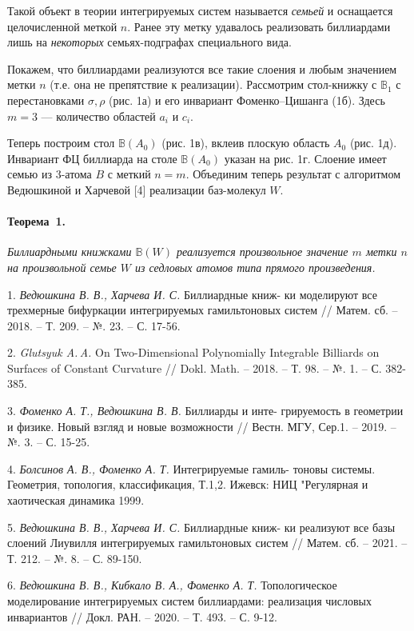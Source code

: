 Такой объект в теории интегрируемых систем называется \textit{семьей} и оснащается целочисленной меткой $n$. Ранее эту метку удавалось реализовать биллиардами лишь на \textit{некоторых} семьях-подграфах специального вида. %
 
Покажем, что биллиардами реализуются все такие слоения и любым значением метки $n$ (т.е. она не препятствие к реализации). Рассмотрим стол-книжку с  $\mathbb{B}_1$ с перестановками $\sigma, \rho$ (рис. 1а) и его инвариант Фоменко--Цишанга (1б). Здесь $m = 3$ --- количество областей $a_i$ и $c_i$. 

Теперь построим стол $\mathbb{B}(A_0)$ (рис. 1в), вклеив плоскую область $A_0$ (рис. 1д). Инвариант ФЦ биллиарда на столе $\mathbb{B}(A_0)$ указан на рис. 1г. Слоение имеет семью из 3-атома $B$ с меткий $n = m$. Объединим теперь результат с алгоритмом Ведюшкиной и Харчевой [4]  реализации баз-молекул $W$.

\paragraph{Теорема~1.}
{\it
	Биллиардными книжками $\mathbb{B}(W)$ реализуется произвольное значение $m$ метки $n$ на произвольной семье $W$ из седловых атомов типа прямого произведения. 
}


\begin{figure}[h]
			\label{elementarybilliards}
		\end{figure}


\litlist

1. {\it Ведюшкина В. В., Харчева И. С.}
 Биллиардные книж-
ки моделируют все трехмерные бифуркации интегрируемых гамильтоновых систем // Матем. сб. – 2018. – Т. 209. – №. 23. – С. 17-56.

2. {\it Glutsyuk A.\,A.} On Two-Dimensional Polynomially Integrable Billiards
on Surfaces of Constant Curvature // Dokl. Math. – 2018. – Т. 98. – №. 1. – С. 382-385.

3. {\it Фоменко А. Т., Ведюшкина В. В.} Биллиарды и инте-
грируемость в геометрии и физике. Новый взгляд и новые возможности // Вестн. МГУ, Сер.1. – 2019. – №. 3. – С. 15-25.

4. {\it Болсинов А. В., Фоменко А. Т.}
Интегрируемые гамиль-
тоновы системы. Геометрия, топология, классификация, Т.1,2.
Ижевск: НИЦ "Регулярная и хаотическая динамика 1999.

5. {\it Ведюшкина В. В., Харчева И. С.}
 Биллиардные книж-
ки реализуют все базы слоений Лиувилля интегрируемых гамильтоновых систем // Матем. сб. – 2021. – Т. 212. – №. 8. – С. 89-150.

6. {\it Ведюшкина В. В.,  Кибкало В. А., Фоменко А. Т.} Топологическое моделирование интегрируемых систем биллиардами: реализация числовых инвариантов // Докл. РАН. – 2020. – Т. 493. – С. 9-12.
